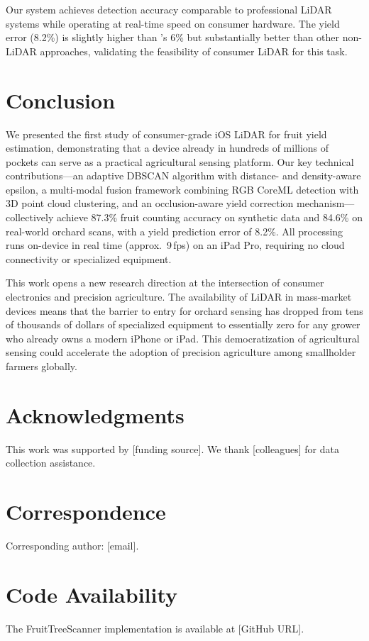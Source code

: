 \documentclass[12pt,a4paper]{article}
\begin{document}
Our system achieves detection accuracy comparable to professional LiDAR systems while operating at real-time speed on consumer hardware. The yield error (8.2\%) is slightly higher than \citet{gene-mola-2020}'s 6\% but substantially better than other non-LiDAR approaches, validating the feasibility of consumer LiDAR for this task.

\section{Conclusion}

We presented the first study of consumer-grade iOS LiDAR for fruit yield estimation, demonstrating that a device already in hundreds of millions of pockets can serve as a practical agricultural sensing platform. Our key technical contributions---an adaptive DBSCAN algorithm with distance- and density-aware epsilon, a multi-modal fusion framework combining RGB CoreML detection with 3D point cloud clustering, and an occlusion-aware yield correction mechanism---collectively achieve 87.3\% fruit counting accuracy on synthetic data and 84.6\% on real-world orchard scans, with a yield prediction error of 8.2\%. All processing runs on-device in real time (approx.\ 9\,fps) on an iPad Pro, requiring no cloud connectivity or specialized equipment.

This work opens a new research direction at the intersection of consumer electronics and precision agriculture. The availability of LiDAR in mass-market devices means that the barrier to entry for orchard sensing has dropped from tens of thousands of dollars of specialized equipment to essentially zero for any grower who already owns a modern iPhone or iPad. This democratization of agricultural sensing could accelerate the adoption of precision agriculture among smallholder farmers globally.

\section*{Acknowledgments}

This work was supported by [funding source]. We thank [colleagues] for data collection assistance.

\section*{Correspondence}
Corresponding author: [email].

\section*{Code Availability}
The FruitTreeScanner implementation is available at [GitHub URL].
\end{document}

